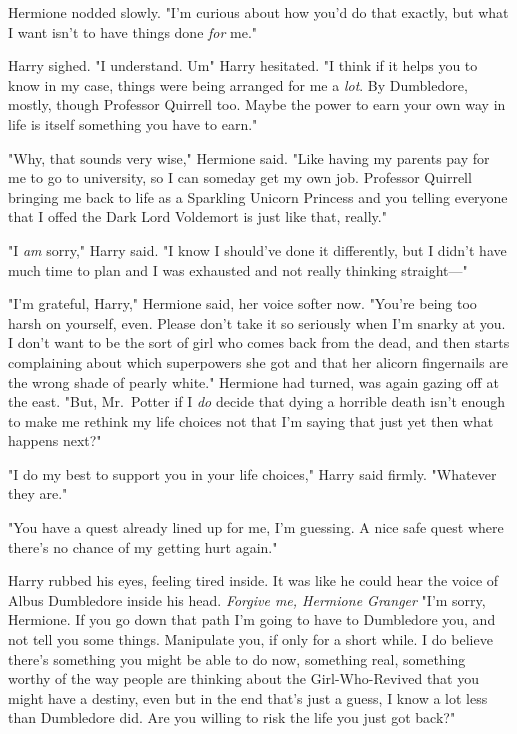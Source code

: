 Hermione nodded slowly. "I'm curious about how you'd do that exactly, but what
I want isn't to have things done \emph{for} me."

Harry sighed. "I understand. Um{\el}" Harry hesitated. "I think{\el} if
it helps you to know{\el} in my case, things were being arranged for me a
\emph{lot}. By Dumbledore, mostly, though Professor Quirrell too. Maybe the
power to earn your own way in life is itself something you have to earn."

"Why, that sounds very wise," Hermione said. "Like having my parents pay for me
to go to university, so I can someday get my own job. Professor Quirrell
bringing me back to life as a Sparkling Unicorn Princess and you telling
everyone that I offed the Dark Lord Voldemort is just like that, really."

"I \emph{am} sorry," Harry said. "I know I should've done it differently,
but{\el} I didn't have much time to plan and I was exhausted and not really
thinking straight\mbox{---}"

"I'm grateful, Harry," Hermione said, her voice softer now. "You're being too
harsh on yourself, even. Please don't take it so seriously when I'm snarky at
you. I don't want to be the sort of girl who comes back from the dead, and then
starts complaining about which superpowers she got and that her alicorn
fingernails are the wrong shade of pearly white." Hermione had turned, was
again gazing off at the east. "But, Mr.~Potter{\el} if I \emph{do} decide
that dying a horrible death isn't enough to make me rethink my life
choices{\el} not that I'm saying that just yet{\el} then what happens
next?"

"I do my best to support you in your life choices," Harry said firmly.
"Whatever they are."

"You have a quest already lined up for me, I'm guessing. A nice safe quest
where there's no chance of my getting hurt again."

Harry rubbed his eyes, feeling tired inside. It was like he could hear the
voice of Albus Dumbledore inside his head. \emph{Forgive me, Hermione
Granger{\el}} "I'm sorry, Hermione. If you go down that path I'm going to
have to Dumbledore you, and not tell you some things. Manipulate you, if only
for a short while. I do believe there's something you might be able to do now,
something real, something worthy of the way people are thinking about the
Girl-Who-Revived{\el} that you might have a destiny, even{\el} but in the
end that's just a guess, I know a lot less than Dumbledore did. Are you willing
to risk the life you just got back?"

